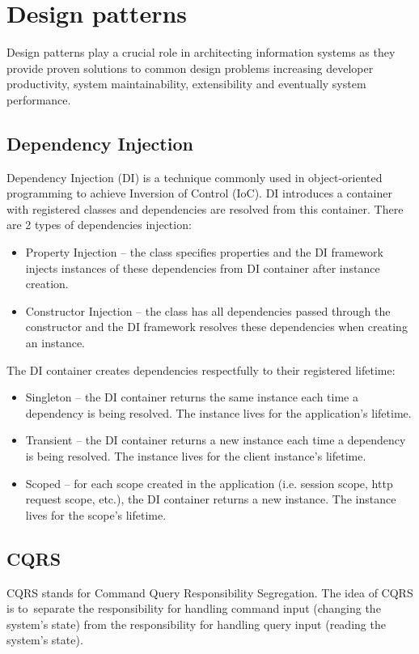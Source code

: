 \section{Design patterns}
\label{theory:design_patterns}
Design patterns play a crucial role in architecting information systems as they provide proven solutions to common design problems increasing developer productivity, system maintainability, extensibility and eventually system performance.

\subsection{Dependency Injection}
\label{theory:DI}
Dependency Injection (DI) is a technique commonly used in object-oriented programming to achieve Inversion of Control (IoC). DI introduces a container with registered classes and dependencies are resolved from this container. There are 2 types of dependencies injection:
\begin{itemize}
    \item Property Injection -- the class specifies properties and the DI framework injects instances of these dependencies from DI container after instance creation.
    \item Constructor Injection -- the class has all dependencies passed through the constructor and the DI framework resolves these dependencies when creating an instance.
\end{itemize}

The DI container creates dependencies respectfully to their registered lifetime:
\begin{itemize}
    \item Singleton -- the DI container returns the same instance each time a dependency is being resolved. The instance lives for the application's lifetime.
    \item Transient -- the DI container returns a new instance each time a dependency is being resolved. The instance lives for the client instance's lifetime.
    \item Scoped -- for each scope created in the application (i.e. session scope, http request scope, etc.), the DI container returns a new instance. The instance lives for the scope's lifetime.
\end{itemize} 

\subsection{CQRS}
\label{theory:CQRS}
CQRS stands for Command Query Responsibility Segregation. The idea of CQRS is to~separate the responsibility for handling command input (changing the system's state) from the responsibility for handling query input (reading the system's state).

